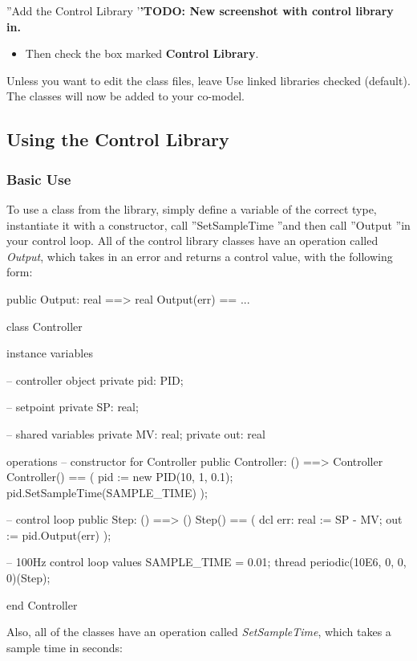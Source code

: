 \documentclass{crescendorepchap}
\begin{document}
''Add the Control Library '\textbf{'TODO: New screenshot with control
library in.}

\begin{itemize}
\item
  Then check the box marked \textbf{Control Library}.
\end{itemize}

Unless you want to edit the class files, leave Use linked libraries
checked (default). The classes will now be added to your co-model.

\subsection{Using the Control Library}

\subsubsection{Basic Use}

To use a class from the library, simply define a variable of the correct
type, instantiate it with a constructor, call ''SetSampleTime ''and then
call ''Output ''in your control loop. All of the control library classes
have an operation called \emph{Output}, which takes in an error and
returns a control value, with the following form:

\begin{vdmrt}
public Output: real ==> real
Output(err) == ...

class Controller

instance variables

-- controller object
private pid: PID;

-- setpoint
private SP: real;

-- shared variables
private MV: real;
private out: real

operations
-- constructor for Controller
public Controller: () ==> Controller
Controller() ==
(
pid := new PID(10, 1, 0.1);
pid.SetSampleTime(SAMPLE_TIME)
);

-- control loop
public Step: () ==> ()
Step() ==
(
dcl err: real := SP - MV;
out := pid.Output(err)
);

-- 100Hz control loop
values SAMPLE_TIME = 0.01;
thread periodic(10E6, 0, 0, 0)(Step);

end Controller
\end{vdmrt}

Also, all of the classes have an operation called \emph{SetSampleTime},
which takes a sample time in seconds:
\end{document}
